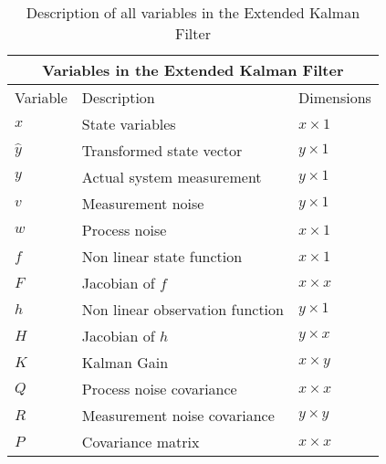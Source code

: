 \newpage

\begin{center}
\begin{table}
\centering
\caption{Description of all variables in the Extended Kalman Filter} \label{tab:sometab}
\begin{tabular}{ |p{2cm}||p{5cm}|p{2cm}| }
    \hline
    \multicolumn{3}{|c|}{Variables in the Extended Kalman Filter } \\ 
    \hline
    Variable & Description & Dimensions \\
    \hline
    $x$ & State variables  & $x \times 1$ \\
    $\hat y$ & Transformed state vector  & $y \times 1$ \\
    $y$ & Actual system measurement & $y \times 1$ \\
    $v$ & Measurement noise & $y \times 1$\\
    $w$ & Process noise & $x \times 1$\\
    $f$ & Non linear state function  & $x \times 1 $  \\ 
    $F$ & Jacobian of $f$  & $x \times x $  \\ 
    $h$ & Non linear observation function & $y \times 1$\\
    $H$ & Jacobian of $h$ & $y \times x$\\
    $K$ & Kalman Gain  & $x \times y$\\
    $Q$ & Process noise covariance  & $x \times x$ \\
    $R$ & Measurement noise covariance &  $y \times y$\\
    $P$ & Covariance matrix & $x \times x $  \\ 
    \hline
\end{tabular}
\end{table}
\end{center}
